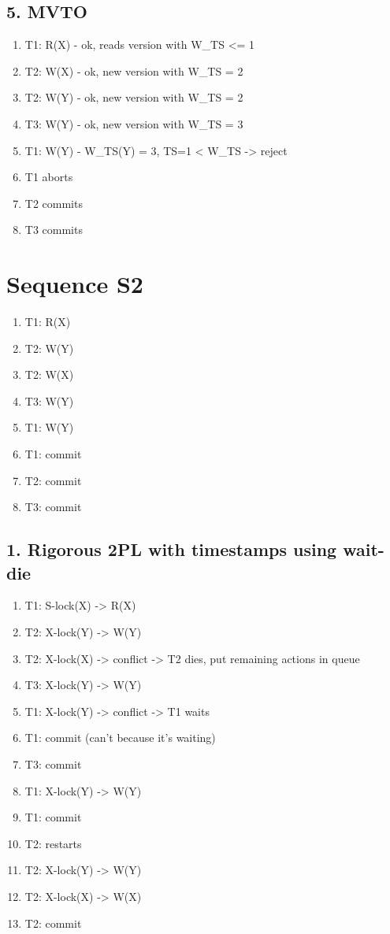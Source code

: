 \documentclass[fleqn]{article}
\begin{document}
  \subsection*{5. MVTO}
  \begin{enumerate}
    \item T1: R(X) - ok, reads version with W_TS <= 1
    \item T2: W(X) - ok, new version with W_TS = 2
    \item T2: W(Y) - ok, new version with W_TS = 2
    \item T3: W(Y) - ok, new version with W_TS = 3
    \item T1: W(Y) - W_TS(Y) = 3, TS=1 < W_TS -> reject
    \item T1 aborts
    \item T2 commits
    \item T3 commits
  \end{enumerate}



\section*{Sequence S2}
  \begin{enumerate}
    \item T1: R(X)
    \item T2: W(Y)
    \item T2: W(X)
    \item T3: W(Y)
    \item T1: W(Y)
    \item T1: commit
    \item T2: commit
    \item T3: commit
  \end{enumerate}


  \subsection*{1. Rigorous 2PL with timestamps using wait-die}
  \begin{enumerate}
    \item T1: S-lock(X) -> R(X)
    \item T2: X-lock(Y) -> W(Y)
    \item T2: X-lock(X) -> conflict -> T2 dies, put remaining actions in queue
    \item T3: X-lock(Y) -> W(Y)
    \item T1: X-lock(Y) -> conflict -> T1 waits 
    \item T1: commit (can't because it's waiting)
    \item T3: commit
    \item T1: X-lock(Y) -> W(Y)
    \item T1: commit
    \item T2: restarts
    \item T2: X-lock(Y) -> W(Y)
    \item T2: X-lock(X) -> W(X)
    \item T2: commit
  \end{enumerate}
\end{document}
